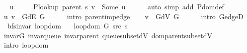 \begin{isabellebody}
\ \isamarkupfalse%
\ u\ \isanewline
\ \ \ \ {\isachardoublequoteopen}P{\isacharunderscore}{\kern0pt}lookup\ {\isacharparenleft}{\kern0pt}parent\ s{\isacharparenright}{\kern0pt}\ v\ {\isacharequal}{\kern0pt}\ Some\ u{\isachardoublequoteclose}\isanewline
\ \ \ \ \isamarkupfalse%
\ {\isacharparenleft}{\kern0pt}auto\ simp\ add{\isacharcolon}{\kern0pt}\ P{\isachardot}{\kern0pt}dom{\isacharunderscore}{\kern0pt}def{\isacharparenright}{\kern0pt}\isanewline
\ \ \isamarkupfalse%
\ {\isachardoublequoteopen}{\isacharparenleft}{\kern0pt}u{\isacharcomma}{\kern0pt}\ v{\isacharparenright}{\kern0pt}\ {\isasymin}\ G{\isachardot}{\kern0pt}dE\ G{\isachardoublequoteclose}\isanewline
\ \ \ \ \isamarkupfalse%
\ {\isacharparenleft}{\kern0pt}intro\ parent{\isacharunderscore}{\kern0pt}imp{\isacharunderscore}{\kern0pt}edge{\isacharparenright}{\kern0pt}\isanewline
\ \ \isamarkupfalse%
\ {\isachardoublequoteopen}v\ {\isasymin}\ G{\isachardot}{\kern0pt}dV\ G{\isachardoublequoteclose}\isanewline
\ \ \ \ \isamarkupfalse%
\ {\isacharparenleft}{\kern0pt}intro\ G{\isachardot}{\kern0pt}edgeD{\isacharparenleft}{\kern0pt}{}{\isacharparenright}{\kern0pt}{\isacharparenright}{\kern0pt}\isanewline
{}\isamarkupfalse%
%
\endisatagproof
{\isafoldproof}%
%
\isadelimproof
%
\endisadelimproof
%
\isadelimdocument
%
\endisadelimdocument
%
\isatagdocument
%
\isamarkuptrue%
%
\endisatagdocument
{\isafolddocument}%
%
\isadelimdocument
%
\endisadelimdocument
{}\isamarkupfalse%
\ {\isacharparenleft}{\kern0pt}\ bfs{\isacharunderscore}{\kern0pt}invar{\isacharparenright}{\kern0pt}\ loop{\isacharunderscore}{\kern0pt}dom{\isacharcolon}{\kern0pt}\isanewline
\ \ \ {\isachardoublequoteopen}loop{\isacharunderscore}{\kern0pt}dom\ {\isacharparenleft}{\kern0pt}G{\isacharcomma}{\kern0pt}\ src{\isacharcomma}{\kern0pt}\ s{\isacharparenright}{\kern0pt}{\isachardoublequoteclose}\isanewline
%
\isadelimproof
\ \ %
\endisadelimproof
%
\isatagproof
{}\isamarkupfalse%
\ invar{\isacharunderscore}{\kern0pt}G\ invar{\isacharunderscore}{\kern0pt}queue\ invar{\isacharunderscore}{\kern0pt}parent\ queue{\isacharunderscore}{\kern0pt}subset{\isacharunderscore}{\kern0pt}dV\ dom{\isacharunderscore}{\kern0pt}parent{\isacharunderscore}{\kern0pt}subset{\isacharunderscore}{\kern0pt}dV\isanewline
\ \ \isamarkupfalse%
\ {\isacharparenleft}{\kern0pt}intro\ loop{\isacharunderscore}{\kern0pt}dom{\isacharparenright}{\kern0pt}%

\end{isabellebody}
